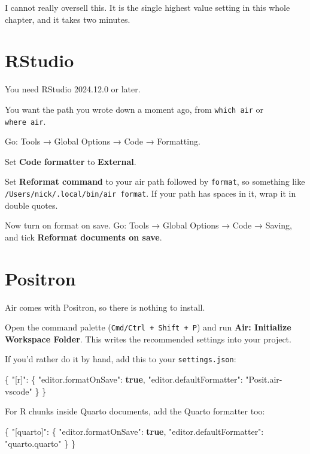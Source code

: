 \documentclass[
  letterpaper,
  justified,
  a4paper]{tufte-book}
\makeatletter
\newenvironment{Shaded}{\begin{snugshade}}{\end{snugshade}}
\newcommand{\DataTypeTok}[1]{\textcolor[rgb]{0.68,0.00,0.00}{#1}}
\newcommand{\FunctionTok}[1]{\textcolor[rgb]{0.28,0.35,0.67}{#1}}
\newcommand{\KeywordTok}[1]{\textcolor[rgb]{0.00,0.23,0.31}{\textbf{#1}}}
\newcommand{\StringTok}[1]{\textcolor[rgb]{0.13,0.47,0.30}{#1}}
\let\rbporigShaded\Shaded
\let\rbporigendShaded\endShaded
\renewenvironment{Shaded}{%
  \begingroup
  \ifdim\linewidth=\rbpbodywidth
    \advance\linewidth by \@tufte@overhang
    \advance\hsize by \@tufte@overhang
    \advance\columnwidth by \@tufte@overhang
  \fi
  \rbporigShaded
}{%
  \rbporigendShaded
  \endgroup
}
\makeatother
\begin{document}
I cannot really oversell this. It is the single highest value setting in
this whole chapter, and it takes two minutes.

\section{RStudio}

You need RStudio 2024.12.0 or later.

You want the path you wrote down a moment ago, from \texttt{which\ air}
or \texttt{where\ air}.

Go: Tools → Global Options → Code → Formatting.

Set \textbf{Code formatter} to \textbf{External}.

Set \textbf{Reformat command} to your air path followed by
\texttt{format}, so something like
\texttt{/Users/nick/.local/bin/air\ format}. If your path has spaces in
it, wrap it in double quotes.

Now turn on format on save. Go: Tools → Global Options → Code → Saving,
and tick \textbf{Reformat documents on save}.

\section{Positron}

Air comes with Positron, so there is nothing to install.

Open the command palette (\texttt{Cmd/Ctrl\ +\ Shift\ +\ P}) and run
\textbf{Air: Initialize Workspace Folder}. This writes the recommended
settings into your project.

If you'd rather do it by hand, add this to your \texttt{settings.json}:

\begin{Shaded}
\begin{Highlighting}[]
\FunctionTok{\{}
  \DataTypeTok{"[r]"}\FunctionTok{:} \FunctionTok{\{}
    \DataTypeTok{"editor.formatOnSave"}\FunctionTok{:} \KeywordTok{true}\FunctionTok{,}
    \DataTypeTok{"editor.defaultFormatter"}\FunctionTok{:} \StringTok{"Posit.air{-}vscode"}
  \FunctionTok{\}}
\FunctionTok{\}}
\end{Highlighting}
\end{Shaded}

For R chunks inside Quarto documents, add the Quarto formatter too:

\begin{Shaded}
\begin{Highlighting}[]
\FunctionTok{\{}
  \DataTypeTok{"[quarto]"}\FunctionTok{:} \FunctionTok{\{}
    \DataTypeTok{"editor.formatOnSave"}\FunctionTok{:} \KeywordTok{true}\FunctionTok{,}
    \DataTypeTok{"editor.defaultFormatter"}\FunctionTok{:} \StringTok{"quarto.quarto"}
  \FunctionTok{\}}
\FunctionTok{\}}
\end{Highlighting}
\end{Shaded}
\end{document}
